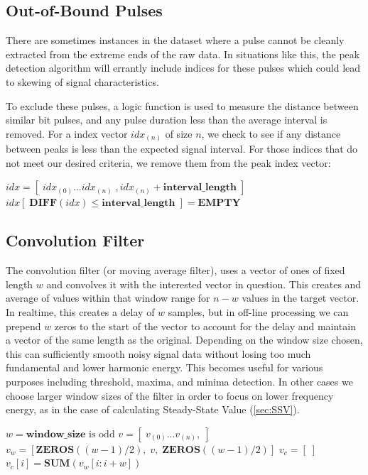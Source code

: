 \documentclass[conference]{IEEEtran}
\begin{document}
\subsection{Out-of-Bound Pulses}  \label{sec:OoBP}
There are sometimes instances in the dataset where a pulse cannot be cleanly extracted from the extreme ends of the raw data. In situations like this, the peak detection algorithm will errantly include indices for these pulses which could lead to skewing of signal characteristics.

To exclude these pulses, a logic function is used to measure the distance between similar bit pulses, and any pulse duration less than the average interval is removed. For a index vector $idx_{(n)}$ of size $n$, we check to see if any distance between peaks is less than the expected signal interval. For those indices that do not meet our desired criteria, we remove them from the peak index vector:
\medbreak
\begin{algorithmic}
\STATE $idx = [\;idx_{(0)} ... idx_{(n)}\;, idx_{(n)} + \textbf{interval\_length}\;]$
\medbreak
\STATE $idx[\;\textbf{DIFF}(idx) \leq \textbf{interval\_length}\;] = \textbf{EMPTY}$
\end{algorithmic}

\subsection{Convolution Filter}
The convolution filter (or moving average filter), uses a vector of ones of fixed length $w$ and convolves it with the interested vector in question. This creates and average of values within that window range for $n-w$ values in the target vector. In realtime, this creates a delay of $w$ samples, but in off-line processing we can prepend $w$ zeros to the start of the vector to account for the delay and maintain a vector of the same length as the original.
Depending on the window size chosen, this can sufficiently smooth noisy signal data without losing too much fundamental and lower harmonic energy. This becomes useful for various purposes including threshold, maxima, and minima detection. In other cases we choose larger window sizes of the filter in order to focus on lower frequency energy, as in the case of calculating Steady-State Value (\ref{sec:SSV}).
\medbreak
\begin{algorithmic}
\STATE $w = \textbf{window\_size} \text{ is odd}$
\STATE $v = [\;v_{(0)} ... v_{(n)},\;]$
\STATE $v_w = [ \textbf{ZEROS}((w-1)/2), \;v,\; \textbf{ZEROS}((w-1)/2)]$
\STATE $v_c = [\;]$
    \STATE $v_c[i] = \textbf{SUM}(v_w[i:i+w])$
\ENDFOR
\end{algorithmic}
\end{document}
